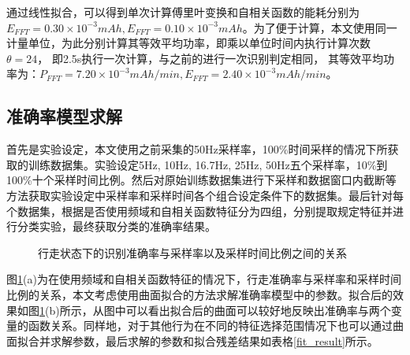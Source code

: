 通过线性拟合，可以得到单次计算傅里叶变换和自相关函数的能耗分别为$E_{FFT} = 0.30 \times 10^{-3} mAh, E_{FFT} = 0.10 \times 10^{-3} mAh$。为了便于计算，本文使用同一计量单位，为此分别计算其等效平均功率，即乘以单位时间内执行计算次数 $\theta = 24$， 即2.5s执行一次计算，与之前的进行一次识别判定相同， 其等效平均功率为：$P_{FFT} = 7.20 \times 10^{-3} mAh/min, E_{FFT} = 2.40 \times 10^{-3} mAh/min$。

\subsection{准确率模型求解}
\par 首先是实验设定，本文使用之前采集的50Hz采样率，100\%时间采样的情况下所获取的训练数据集。实验设定5Hz, 10Hz, 16.7Hz, 25Hz, 50Hz五个采样率，10\%到100\%十个采样时间比例。然后对原始训练数据集进行下采样和数据窗口内截断等方法获取实验设定中采样率和采样时间各个组合设定条件下的数据集。最后针对每个数据集，根据是否使用频域和自相关函数特征分为四组，分别提取规定特征并进行分类实验，最终获取分类的准确率结果。

\begin{figure}[htb]
    \centering
    \caption{行走状态下的识别准确率与采样率以及采样时间比例之间的关系}\label{fit_precision}
\end{figure}

\par 图\ref{fit_precision}(a)为在使用频域和自相关函数特征的情况下，行走准确率与采样率和采样时间比例的关系，本文考虑使用曲面拟合的方法求解准确率模型中的参数。拟合后的效果如图\ref{fit_precision}(b)所示，从图中可以看出拟合后的曲面可以较好地反映出准确率与两个变量的函数关系。同样地，对于其他行为在不同的特征选择范围情况下也可以通过曲面拟合并求解参数，最后求解的参数和拟合残差结果如表格\ref{fit_result}所示。

